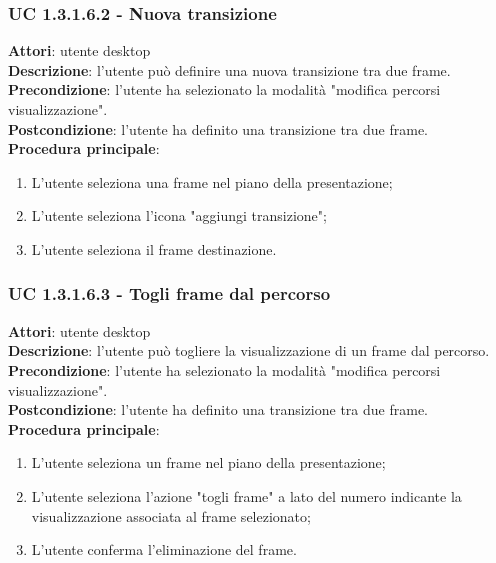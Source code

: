 \subsubsection{UC 1.3.1.6.2 - Nuova transizione}{
	\label{uc1.3.1.6.2}
	\textbf{Attori}: utente desktop \\
	\textbf{Descrizione}: l'utente può definire una nuova transizione tra due frame. \\
	\textbf{Precondizione}: l'utente ha selezionato la modalità "modifica percorsi visualizzazione".	\\
	\textbf{Postcondizione}: l'utente ha definito una transizione tra due frame.	\\
	\textbf{Procedura principale}:
	\begin{enumerate}
		\item L'utente seleziona una frame nel piano della presentazione;
		\item L'utente seleziona l'icona "aggiungi transizione";
		\item L'utente seleziona il frame destinazione.
	\end{enumerate}
}
\subsubsection{UC 1.3.1.6.3 - Togli frame dal percorso}{
	\label{uc1.3.1.6.3}
	\textbf{Attori}: utente desktop \\
	\textbf{Descrizione}: l'utente può togliere la visualizzazione di un frame dal percorso. \\
	\textbf{Precondizione}: l'utente ha selezionato la modalità "modifica percorsi visualizzazione".	\\
	\textbf{Postcondizione}: l'utente ha definito una transizione tra due frame.	\\
	\textbf{Procedura principale}:
	\begin{enumerate}
		\item L'utente seleziona un frame nel piano della presentazione;
		\item L'utente seleziona l'azione "togli frame" a lato del numero indicante la visualizzazione associata al frame selezionato;
		\item L'utente conferma l'eliminazione del frame.
	\end{enumerate}
}
